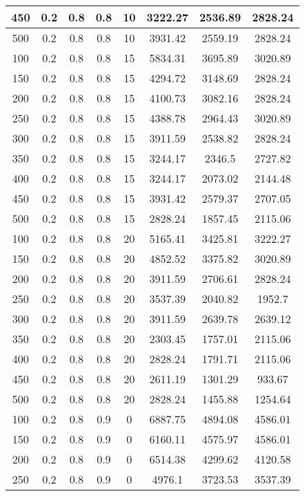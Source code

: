 \documentclass[a4paper, 12pt]{extreport}
\begin{document}
\begin{itemize}
\begin{longtable}{|c|c|c|c|c|c|c|c|}
			450 & 0.2 & 0.8 & 0.8 & 10 & 3222.27 & 2536.89 & 2828.24 \\\hline
			500 & 0.2 & 0.8 & 0.8 & 10 & 3931.42 & 2559.19 & 2828.24 \\\hline
			100 & 0.2 & 0.8 & 0.8 & 15 & 5834.31 & 3695.89 & 3020.89 \\\hline
			150 & 0.2 & 0.8 & 0.8 & 15 & 4294.72 & 3148.69 & 2828.24 \\\hline
			200 & 0.2 & 0.8 & 0.8 & 15 & 4100.73 & 3082.16 & 2828.24 \\\hline
			250 & 0.2 & 0.8 & 0.8 & 15 & 4388.78 & 2964.43 & 3020.89 \\\hline
			300 & 0.2 & 0.8 & 0.8 & 15 & 3911.59 & 2538.82 & 2828.24 \\\hline
			350 & 0.2 & 0.8 & 0.8 & 15 & 3244.17 & 2346.5 & 2727.82 \\\hline
			400 & 0.2 & 0.8 & 0.8 & 15 & 3244.17 & 2073.02 & 2144.48 \\\hline
			450 & 0.2 & 0.8 & 0.8 & 15 & 3931.42 & 2579.37 & 2707.05 \\\hline
			500 & 0.2 & 0.8 & 0.8 & 15 & 2828.24 & 1857.45 & 2115.06 \\\hline
			100 & 0.2 & 0.8 & 0.8 & 20 & 5165.41 & 3425.81 & 3222.27 \\\hline
			150 & 0.2 & 0.8 & 0.8 & 20 & 4852.52 & 3375.82 & 3020.89 \\\hline
			200 & 0.2 & 0.8 & 0.8 & 20 & 3911.59 & 2706.61 & 2828.24 \\\hline
			250 & 0.2 & 0.8 & 0.8 & 20 & 3537.39 & 2040.82 & 1952.7 \\\hline
			300 & 0.2 & 0.8 & 0.8 & 20 & 3911.59 & 2639.78 & 2639.12 \\\hline
			350 & 0.2 & 0.8 & 0.8 & 20 & 2303.45 & 1757.01 & 2115.06 \\\hline
			400 & 0.2 & 0.8 & 0.8 & 20 & 2828.24 & 1791.71 & 2115.06 \\\hline
			450 & 0.2 & 0.8 & 0.8 & 20 & 2611.19 & 1301.29 & 933.67 \\\hline
			500 & 0.2 & 0.8 & 0.8 & 20 & 2828.24 & 1455.88 & 1254.64 \\\hline
			100 & 0.2 & 0.8 & 0.9 & 0 & 6887.75 & 4894.08 & 4586.01 \\\hline
			150 & 0.2 & 0.8 & 0.9 & 0 & 6160.11 & 4575.97 & 4586.01 \\\hline
			200 & 0.2 & 0.8 & 0.9 & 0 & 6514.38 & 4299.62 & 4120.58 \\\hline
			250 & 0.2 & 0.8 & 0.9 & 0 & 4976.1 & 3723.53 & 3537.39 \\\hline

\end{longtable}
\end{itemize}
\end{document}
